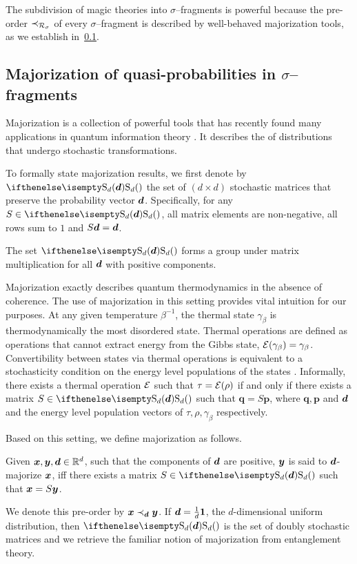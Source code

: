 \documentclass[pra,
aps,
twocolumn,
superscriptaddress,
groupedaddress,
nofootinbib,
reprint
]{revtex4-1}
\begin{document}
The subdivision of magic theories into $\sigma$--fragments is powerful because the pre-order $\prec_{\mathcal{R}_\sigma}$ of every $\sigma$--fragment is described by well-behaved majorization tools, as we establish in~\cref{sec:major}.

\subsection{Majorization of quasi-probabilities in $\sigma$--fragments}\label{sec:major}

Majorization is a collection of powerful tools that has recently found many applications in quantum information theory .
It describes the  of distributions that undergo stochastic transformations.

To formally state majorization results, we first denote by $\stoch$ the set of $(d \times d)$ stochastic matrices that preserve the probability vector $\bm{d}$.
Specifically, for any $S \in \stoch$, all matrix elements are non-negative, all rows sum to $1$ and $S\bm{d} = \bm{d}$.

The set $\stoch$ forms a group under matrix multiplication for all $\bm{d}$ with positive components.

Majorization exactly describes quantum thermodynamics in the absence of coherence.
The use of majorization in this setting provides vital intuition for our purposes.
At any given temperature $\beta^{-1}$, the thermal state $\gamma_\beta$ is thermodynamically the most disordered state. 
Thermal operations are defined as operations that cannot extract energy from the Gibbs state, $\mathcal{E}(\gamma_\beta) = \gamma_\beta$.
Convertibility between states via thermal operations is equivalent to a stochasticity condition on the energy level populations of the states .
Informally, there exists a thermal operation $\mathcal{E}$ such that $\tau = \mathcal{E}(\rho)$ if and only if there exists a matrix $S \in \stoch$ such that $\bm{q} = S\bm{p}$, where $\bm{q}, \bm{p}$ and $\bm{d}$ and the energy level population vectors of $\tau, \rho, \gamma_\beta$ respectively.

Based on this setting, we define majorization as follows.
\begin{definition}\label{def:dmajor}
    Given $\bm{x}, \bm{y}, \bm{d} \in \mathbb{R}^d$, such that the components of $\bm{d}$ are positive, $\bm{y}$ is said to $\bm{d}$-majorize $\bm{x}$, iff there exists a matrix $S \in \stoch$ such that $\bm{x} = S\bm{y}$.
\end{definition}
We denote this pre-order by $\bm{x} \prec_{\bm{d}} \bm{y}$.
If $\bm{d} = \frac{1}{d}\bm{1}$, the $d$-dimensional uniform distribution, then $\stoch$ is the set of doubly stochastic matrices and we retrieve the familiar notion of majorization from entanglement theory. 
\end{document}
